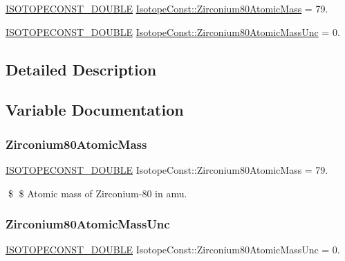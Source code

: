 \begin{DoxyCompactItemize}
\item 
\mbox{\hyperlink{group___isotope_const-_macros_ga8f45a7272ce02c0b4c65c44636ed719a}{I\+S\+O\+T\+O\+P\+E\+C\+O\+N\+S\+T\+\_\+\+D\+O\+U\+B\+LE}} \mbox{\hyperlink{group___isotope_const-_zirconium-_zr80_ga860ce03c0612830762e13407b98c56e1}{Isotope\+Const\+::\+Zirconium80\+Atomic\+Mass}} = 79.
\item 
\mbox{\hyperlink{group___isotope_const-_macros_ga8f45a7272ce02c0b4c65c44636ed719a}{I\+S\+O\+T\+O\+P\+E\+C\+O\+N\+S\+T\+\_\+\+D\+O\+U\+B\+LE}} \mbox{\hyperlink{group___isotope_const-_zirconium-_zr80_gaf533f64726134e7d77612a738b443ddf}{Isotope\+Const\+::\+Zirconium80\+Atomic\+Mass\+Unc}} = 0.
\end{DoxyCompactItemize}


\subsection{Detailed Description}


\subsection{Variable Documentation}
\mbox{\label{group___isotope_const-_zirconium-_zr80_ga860ce03c0612830762e13407b98c56e1}} 
\subsubsection{\texorpdfstring{Zirconium80\+Atomic\+Mass}{Zirconium80AtomicMass}}
{\footnotesize\ttfamily \mbox{\hyperlink{group___isotope_const-_macros_ga8f45a7272ce02c0b4c65c44636ed719a}{I\+S\+O\+T\+O\+P\+E\+C\+O\+N\+S\+T\+\_\+\+D\+O\+U\+B\+LE}} Isotope\+Const\+::\+Zirconium80\+Atomic\+Mass = 79.}

\$ \$ Atomic mass of Zirconium-\/80 in amu. \mbox{\label{group___isotope_const-_zirconium-_zr80_gaf533f64726134e7d77612a738b443ddf}} 
\subsubsection{\texorpdfstring{Zirconium80\+Atomic\+Mass\+Unc}{Zirconium80AtomicMassUnc}}
{\footnotesize\ttfamily \mbox{\hyperlink{group___isotope_const-_macros_ga8f45a7272ce02c0b4c65c44636ed719a}{I\+S\+O\+T\+O\+P\+E\+C\+O\+N\+S\+T\+\_\+\+D\+O\+U\+B\+LE}} Isotope\+Const\+::\+Zirconium80\+Atomic\+Mass\+Unc = 0.}

